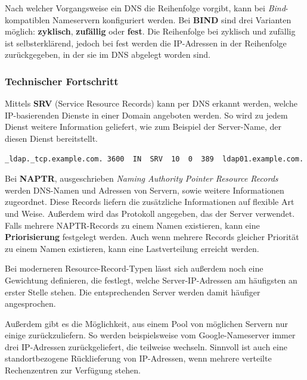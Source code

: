 Nach welcher Vorgangsweise ein DNS die Reihenfolge vorgibt, kann bei
\textit{Bind}-kompatiblen Nameservern konfiguriert werden. Bei \textbf{BIND} sind drei Varianten möglich: \textbf{zyklisch}, \textbf{zufällig} oder \textbf{fest}. Die Reihenfolge bei zyklisch und zufällig ist selbsterklärend, jedoch bei fest werden die IP-Adressen in der Reihenfolge zurückgegeben, in der sie im DNS abgelegt worden sind.

\subsubsection{Technischer Fortschritt}\cite{SRVResourceRecord}
Mittels \textbf{SRV} (Service Resource Records) kann per DNS erkannt werden, welche IP-basierenden Dienste in einer Domain angeboten werden. So wird zu jedem Dienst weitere Information geliefert, wie zum Beispiel der Server-Name, der diesen Dienst bereitstellt.

\begin{center}
	
	\begin{lstlisting}[caption=SRV - (Service) Resource Records]
	_ldap._tcp.example.com. 3600  IN  SRV  10  0  389  ldap01.example.com.
	\end{lstlisting}
\end{center}


Bei \textbf{NAPTR}, ausgeschrieben \textit{Naming Authority Pointer Resource Records}
werden DNS-Namen und Adressen von Servern, sowie weitere Informationen zugeordnet. Diese Records liefern die zusätzliche Informationen auf flexible Art und Weise. Außerdem wird das Protokoll angegeben, das der Server verwendet. Falls mehrere NAPTR-Records zu einem Namen existieren, kann eine \textbf{Priorisierung} festgelegt werden. Auch wenn mehrere Records gleicher Priorität zu einem Namen existieren, kann eine Lastverteilung erreicht werden.

Bei moderneren Resource-Record-Typen lässt sich außerdem noch eine Gewichtung definieren, die festlegt, welche Server-IP-Adressen am häufigsten an erster Stelle stehen. Die entsprechenden Server werden damit häufiger angesprochen.

Außerdem gibt es die Möglichkeit, aus einem Pool von möglichen Servern nur einige zurückzuliefern. So werden beispielsweise vom Google-Nameserver immer drei IP-Adressen zurückgeliefert, die teilweise wechseln. Sinnvoll ist auch eine standortbezogene Rücklieferung von IP-Adressen, wenn mehrere verteilte Rechenzentren zur Verfügung stehen.

